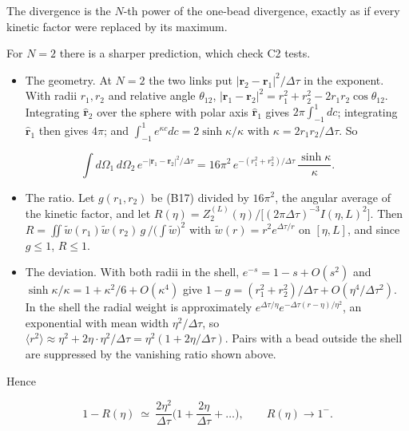 \documentclass[11pt,a4paper]{article}
\newcommand{\tagmark}[1]{\marginnote{\scriptsize\ttfamily #1}}
\providecommand{\tightlist}{\setlength{\itemsep}{0pt}\setlength{\parskip}{0pt}}
\begin{document}
The divergence is the \(N\)-th power of the one-bead divergence, exactly as if every kinetic factor were replaced by its maximum.

\tagmark{[D]} For \(N=2\) there is a sharper prediction, which check C2 tests.

\begin{itemize}
\tightlist
\item
  The geometry. At \(N=2\) the two links put \(|\mathbf r_2-\mathbf r_1|^2/\Delta\tau\) in the exponent. With radii \(r_1,r_2\) and relative angle \(\theta_{12}\), \(|\mathbf r_1-\mathbf r_2|^2=r_1^2+r_2^2-2r_1r_2\cos\theta_{12}\). Integrating \(\hat{\mathbf r}_2\) over the sphere with polar axis \(\hat{\mathbf r}_1\) gives \(2\pi\int_{-1}^1dc\); integrating \(\hat{\mathbf r}_1\) then gives \(4\pi\); and \(\int_{-1}^1e^{\kappa c}dc=2\sinh\kappa/\kappa\) with \(\kappa=2r_1r_2/\Delta\tau\). So
\end{itemize}

\begin{equation}
\int d\Omega_1\,d\Omega_2\,e^{-|\mathbf r_1-\mathbf r_2|^2/\Delta\tau}=16\pi^2\,e^{-(r_1^2+r_2^2)/\Delta\tau}\,\frac{\sinh\kappa}{\kappa}.\tag{B17}
\end{equation}

\begin{itemize}
\tightlist
\item
  The ratio. Let \(g(r_1,r_2)\) be (B17) divided by \(16\pi^2\), the angular average of the kinetic factor, and let \(R(\eta)=Z_2^{(L)}(\eta)/\big[(2\pi\Delta\tau)^{-3}I(\eta,L)^2\big]\). Then \(R=\iint\tilde w(r_1)\tilde w(r_2)\,g\,/\big(\int\tilde w\big)^2\) with \(\tilde w(r)=r^2e^{\Delta\tau/r}\) on \([\eta,L]\), and since \(g\le1\), \(R\le1\).
\item
  The deviation. With both radii in the shell, \(e^{-s}=1-s+O(s^2)\) and \(\sinh\kappa/\kappa=1+\kappa^2/6+O(\kappa^4)\) give \(1-g=(r_1^2+r_2^2)/\Delta\tau+O(\eta^4/\Delta\tau^2)\). In the shell the radial weight is approximately \(e^{\Delta\tau/\eta}e^{-\Delta\tau(r-\eta)/\eta^2}\), an exponential with mean width \(\eta^2/\Delta\tau\), so \(\langle r^2\rangle\approx\eta^2+2\eta\cdot\eta^2/\Delta\tau=\eta^2(1+2\eta/\Delta\tau)\). Pairs with a bead outside the shell are suppressed by the vanishing ratio shown above.
\end{itemize}

Hence

\begin{equation}
1-R(\eta)\ \simeq\ \frac{2\eta^2}{\Delta\tau}\Big(1+\frac{2\eta}{\Delta\tau}+\dots\Big),\qquad R(\eta)\to1^- .\tag{B18}
\end{equation}
\end{document}
